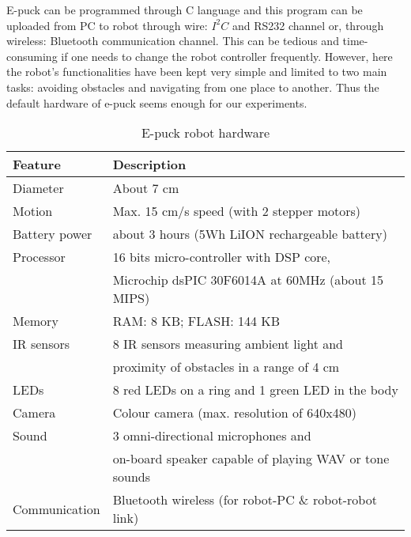 E-puck can be programmed through C language and this program can be uploaded from PC to robot through wire: $I^{2}C$ and RS232 channel or, through  wireless: Bluetooth communication channel. This can be tedious and time-consuming if one needs to change the robot controller frequently. However, here  the robot's functionalities have been kept very simple and limited to two main tasks: avoiding obstacles and navigating from one place to another. Thus the default hardware of e-puck seems enough for our experiments.
\begin{table}
\caption{E-puck robot hardware}
\label{table:epuck}
\begin{center}
\begin{tabular}{|l|l|}
\hline \textbf{Feature} & \textbf{Description}\\
\hline Diameter & About 7 cm\\
\hline Motion & Max. 15 cm/s speed (with 2 stepper motors)\\
\hline Battery power & about 3 hours (5Wh LiION rechargeable battery)\\
\hline Processor & 16 bits micro-controller with DSP core,\\ & Microchip dsPIC 30F6014A at 60MHz (about 15 MIPS)\\
\hline Memory & RAM: 8 KB; FLASH: 144 KB \\
\hline IR sensors & 8 IR sensors measuring ambient light and \\ & proximity of obstacles in a range of 4 cm\\
\hline LEDs & 8 red LEDs on a ring and 1 green LED in the body \\
\hline Camera & Colour camera (max. resolution of 640x480) \\
\hline Sound & 3 omni-directional microphones and\\ & on-board speaker capable of playing WAV or tone sounds\\
\hline Communication & Bluetooth wireless (for robot-PC \& robot-robot link)\\
\hline
\end{tabular}
\end{center}
\end{table}
